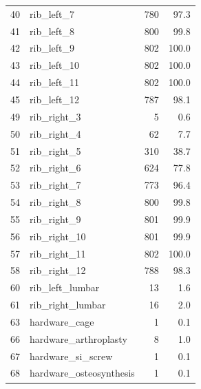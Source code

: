 \begin{table}[p]
\begin{tabular}{@{}rlrr@{}}
40 & rib\_left\_7 & 780 & 97.3 \\
41 & rib\_left\_8 & 800 & 99.8 \\
42 & rib\_left\_9 & 802 & 100.0 \\
43 & rib\_left\_10 & 802 & 100.0 \\
44 & rib\_left\_11 & 802 & 100.0 \\
45 & rib\_left\_12 & 787 & 98.1 \\
49 & rib\_right\_3 & 5 & 0.6 \\
50 & rib\_right\_4 & 62 & 7.7 \\
51 & rib\_right\_5 & 310 & 38.7 \\
52 & rib\_right\_6 & 624 & 77.8 \\
53 & rib\_right\_7 & 773 & 96.4 \\
54 & rib\_right\_8 & 800 & 99.8 \\
55 & rib\_right\_9 & 801 & 99.9 \\
56 & rib\_right\_10 & 801 & 99.9 \\
57 & rib\_right\_11 & 802 & 100.0 \\
58 & rib\_right\_12 & 788 & 98.3 \\
60 & rib\_left\_lumbar & 13 & 1.6 \\
61 & rib\_right\_lumbar & 16 & 2.0 \\
63 & hardware\_cage & 1 & 0.1 \\
66 & hardware\_arthroplasty & 8 & 1.0 \\
67 & hardware\_si\_screw & 1 & 0.1 \\
68 & hardware\_osteosynthesis & 1 & 0.1 \\
\bottomrule
\end{tabular}
\end{table}

